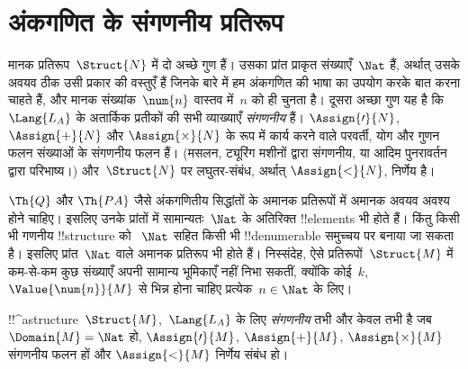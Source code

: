 \documentclass[../../../include/open-logic-section]{subfiles}
\begin{document}
\section{अंकगणित के संगणनीय प्रतिरूप}

\begin{explain}
मानक प्रतिरूप~$\Struct{N}$ में दो अच्छे गुण हैं। उसका प्रांत प्राकृत
संख्याएँ~$\Nat$ हैं, अर्थात् उसके अवयव ठीक उसी प्रकार की वस्तुएँ हैं जिनके
बारे में हम अंकगणित की भाषा का उपयोग करके बात करना चाहते हैं, और मानक
संख्यांक~$\num{n}$ वास्तव में~$n$ को ही चुनता है। दूसरा अच्छा गुण यह है कि
~$\Lang{L_A}$ के अतार्किक प्रतीकों की सभी व्याख्याएँ \emph{संगणनीय} हैं।
$\Assign{\prime}{N}$, $\Assign{+}{N}$ और $\Assign{\times}{N}$ के रूप में
कार्य करने वाले परवर्ती, योग और गुणन फलन संख्याओं के संगणनीय फलन हैं।
(मसलन, ट्यूरिंग मशीनों द्वारा संगणनीय, या आदिम पुनरावर्तन द्वारा परिभाष्य।)
और~$\Struct{N}$ पर लघुतर-संबंध, अर्थात् $\Assign{<}{N}$, निर्णेय है।

$\Th{Q}$ और $\Th{PA}$ जैसे अंकगणितीय सिद्धांतों के अमानक प्रतिरूपों में
अमानक अवयव अवश्य होने चाहिए। इसलिए उनके प्रांतों में सामान्यतः~$\Nat$ के
अतिरिक्त !!{element}s भी होते हैं। किंतु किसी भी गणनीय !!{structure} को
~$\Nat$ सहित किसी भी !!{denumerable} समुच्चय पर बनाया जा सकता है। इसलिए
प्रांत~$\Nat$ वाले अमानक प्रतिरूप भी होते हैं। निस्संदेह, ऐसे
प्रतिरूपों~$\Struct{M}$ में कम-से-कम कुछ संख्याएँ अपनी सामान्य भूमिकाएँ नहीं
निभा सकतीं, क्योंकि कोई~$k$,~$\Value{\num{n}}{M}$ से भिन्न होना चाहिए
प्रत्येक~$n \in \Nat$ के लिए।
\end{explain}

\begin{defn}
!!^a{structure}~$\Struct{M}$,~$\Lang{L_A}$ के लिए \emph{संगणनीय} तभी और केवल
तभी है जब $\Domain{M} = \Nat$ हो, $\Assign{\prime}{M}$,
$\Assign{+}{M}$, $\Assign{\times}{M}$ संगणनीय फलन हों और
$\Assign{<}{M}$ निर्णेय संबंध हो।
\end{defn}
\end{document}

